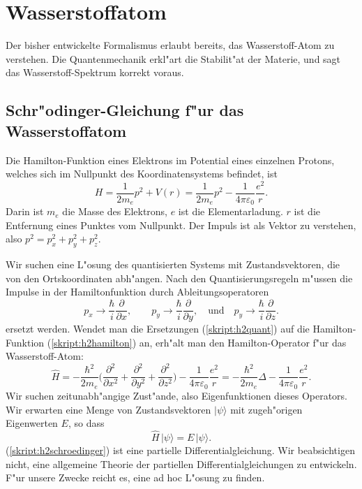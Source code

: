 \chapter{Wasserstoffatom\label{chapter:wasserstoff}}
\rhead{}
Der bisher entwickelte Formalismus erlaubt bereits, das Wasserstoff-Atom
zu verstehen. Die Quantenmechanik erkl"art die Stabilit"at der
Materie, und sagt das Wasserstoff-Spektrum korrekt voraus.
\section{Schr"odinger-Gleichung f"ur das Wasserstoffatom}
Die Hamilton-Funktion eines Elektrons im Potential eines einzelnen
Protons, welches sich im Nullpunkt des Koordinatensystems befindet,
ist
\begin{equation}
H=\frac1{2m_e}p^2 + V(r)
=\frac1{2m_e}p^2 - \frac1{4\pi\varepsilon_0}\frac{e^2}{r}.
\label{skript:h2hamilton}
\end{equation}
Darin ist $m_e$ die Masse des Elektrons, $e$ ist die Elementarladung.
$r$ ist die Entfernung eines Punktes vom Nullpunkt.
Der Impuls ist als Vektor zu verstehen, also $p^2=p_x^2+p_y^2+p_z^2$.

Wir suchen eine L"osung des quantisierten Systems mit Zustandsvektoren, die von
den Ortskoordinaten abh"angen.
Nach den Quantisierungsregeln m"ussen die Impulse in der Hamiltonfunktion
durch Ableitungsoperatoren
\begin{equation}
p_x\rightarrow \frac{\hbar}{i}\frac{\partial}{\partial x},
\qquad
p_y\rightarrow \frac{\hbar}{i}\frac{\partial}{\partial y},
\quad
\text{und}
\quad
p_y\rightarrow \frac{\hbar}{i}\frac{\partial}{\partial z}.
\label{skript:h2quant}
\end{equation}
ersetzt werden. Wendet man die Ersetzungen (\ref{skript:h2quant}) auf die
Hamilton-Funktion (\ref{skript:h2hamilton}) an, erh"alt man den Hamilton-Operator
f"ur das Wasserstoff-Atom:
\[
\hat H=-\frac{\hbar^2}{2m_e}\biggl(
\frac{\partial^2}{\partial x^2}+
\frac{\partial^2}{\partial y^2}+
\frac{\partial^2}{\partial z^2}
\biggr)-\frac1{4\pi\varepsilon_0}\frac{e^2}{r}
=-\frac{\hbar^2}{2m_e}\Delta -\frac1{4\pi\varepsilon_0}\frac{e^2}{r}.
\]
Wir suchen zeitunabh"angige Zust"ande, also Eigenfunktionen dieses
Operators. Wir erwarten eine Menge von Zustandsvektoren $|\psi\rangle$
mit zugeh"origen Eigenwerten $E$, so dass
\begin{equation}
\hat H\,|\psi\rangle = E\,|\psi\rangle.
\label{skript:h2schroedinger}
\end{equation}
(\ref{skript:h2schroedinger}) ist eine partielle Differentialgleichung.
Wir beabsichtigen nicht, eine allgemeine Theorie der partiellen
Differentialgleichungen zu entwickeln.
F"ur unsere Zwecke reicht es, eine ad hoc L"osung zu finden.

